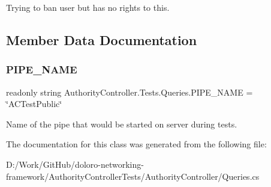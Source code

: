 Trying to ban user but has no rights to this. 



\subsection{Member Data Documentation}
\mbox{\label{class_authority_controller_1_1_tests_1_1_queries_a8cf9d1089864d1bdea1a5ae54c321de3}} 
\subsubsection{\texorpdfstring{P\+I\+P\+E\+\_\+\+N\+A\+ME}{PIPE\_NAME}}
{\footnotesize\ttfamily readonly string Authority\+Controller.\+Tests.\+Queries.\+P\+I\+P\+E\+\_\+\+N\+A\+ME = \char`\"{}A\+C\+Test\+Public\char`\"{}\hspace{0.3cm}{\ttfamily [private]}}



Name of the pipe that would be started on server during tests. 



The documentation for this class was generated from the following file\+:\begin{DoxyCompactItemize}
\item 
D\+:/\+Work/\+Git\+Hub/doloro-\/networking-\/framework/\+Authority\+Controller\+Tests/\+Authority\+Controller/Queries.\+cs\end{DoxyCompactItemize}

